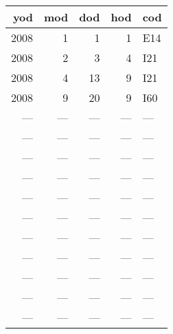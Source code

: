 \begin{tabular}{rrrrl}
  \toprule
 yod & mod & dod & hod & cod \\ 
  \midrule
  2008 &   1 &   1 &   1 & E14 \\ 
  2008 &   2 &   3 &   4 & I21 \\ 
  2008 &   4 &  13 &   9 & I21 \\ 
  2008 &   9 &  20 &   9 & I60 \\ 
  --- & --- & --- & --- & --- \\ 
  --- & --- & --- & --- & --- \\ 
  --- & --- & --- & --- & --- \\ 
  --- & --- & --- & --- & --- \\ 
  --- & --- & --- & --- & --- \\ 
  --- & --- & --- & --- & --- \\ 
  --- & --- & --- & --- & --- \\ 
  --- & --- & --- & --- & --- \\ 
  --- & --- & --- & --- & --- \\ 
  --- & --- & --- & --- & --- \\ 
  --- & --- & --- & --- & --- \\ 
   \bottomrule
\end{tabular}
